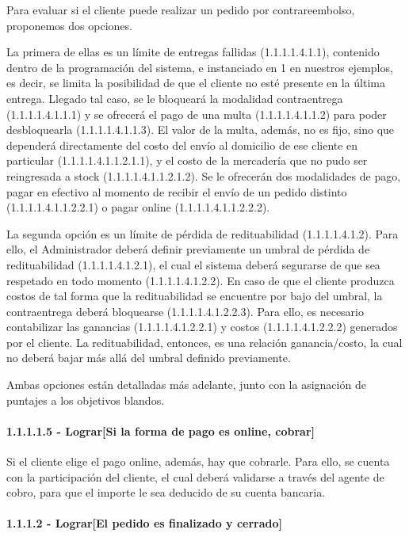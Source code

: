 Para evaluar si el cliente puede realizar un pedido por contrareembolso,
proponemos dos opciones.

La primera de ellas es un límite de entregas fallidas (1.1.1.1.4.1.1), contenido
dentro de la programación del sistema, e instanciado en 1 en nuestros ejemplos,
es decir, se limita la posibilidad de que el cliente no esté presente en la
última entrega. Llegado tal caso, se le bloqueará la modalidad contraentrega
(1.1.1.1.4.1.1.1) y se ofrecerá el pago de una multa (1.1.1.1.4.1.1.2) para
poder desbloquearla (1.1.1.1.4.1.1.3). El valor de la multa, además, no es fijo,
sino que dependerá directamente del costo del envío al domicilio de ese cliente
en particular (1.1.1.1.4.1.1.2.1.1), y el costo de la mercadería que no pudo ser
reingresada a stock (1.1.1.1.4.1.1.2.1.2). Se le ofrecerán dos modalidades de
pago, pagar en efectivo al momento de recibir el envío de un pedido distinto
(1.1.1.1.4.1.1.2.2.1) o pagar online (1.1.1.1.4.1.1.2.2.2).

La segunda opción es un límite de pérdida de redituabilidad (1.1.1.1.4.1.2).
Para ello, el Administrador deberá definir previamente un umbral de pérdida de
redituabilidad (1.1.1.1.4.1.2.1), el cual el sistema deberá segurarse de que sea
respetado en todo momento (1.1.1.1.4.1.2.2). En caso de que el cliente produzca
costos de tal forma que la redituabilidad se encuentre por bajo del umbral, la
contraentrega deberá bloquearse (1.1.1.1.4.1.2.2.3). Para ello, es necesario
contabilizar las ganancias (1.1.1.1.4.1.2.2.1) y costos (1.1.1.1.4.1.2.2.2)
generados por el cliente. La redituabilidad, entonces, es una relación
ganancia/costo, la cual no deberá bajar más allá del umbral definido
previamente.

Ambas opciones están detalladas más adelante, junto con la asignación de
puntajes a los objetivos blandos.

\paragraph{1.1.1.1.5 - Lograr[Si la forma de pago es online, cobrar]} \label{para:1.1.1.1.5}

Si el cliente elige el pago online, además, hay que cobrarle. Para ello, se
cuenta con la participación del cliente, el cual deberá validarse a través del
agente de cobro, para que el importe le sea deducido de su cuenta bancaria.

\clearpage
\paragraph{1.1.1.2 - Lograr[El pedido es finalizado y cerrado]} \label{para:1.1.1.2}

